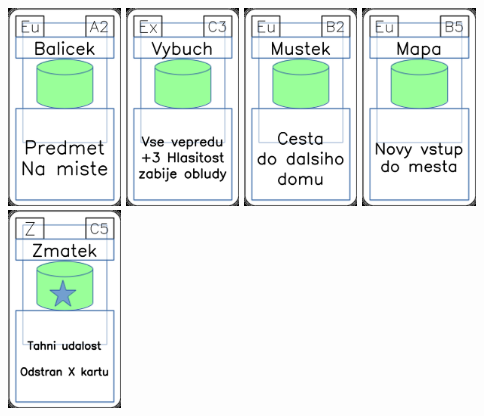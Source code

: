 \documentclass[a4paper]{article}
\begin{document}
	\includegraphics[width=3.0cm]{img-4_31}
	\includegraphics[width=3.0cm]{img-4_12}
	\includegraphics[width=3.0cm]{img-4_36}
	\includegraphics[width=3.0cm]{img-4_39}
	\includegraphics[width=3.0cm]{img-5_44}
\end{document}
